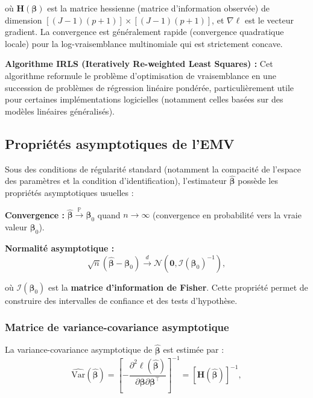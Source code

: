 \documentclass[12pt,a4paper]{article}
\begin{document}
où $\mathbf{H}(\boldsymbol{\beta})$ est la matrice hessienne (matrice d'information observée) de dimension $[(J-1)(p+1)] \times [(J-1)(p+1)]$, et $\nabla \ell$ est le vecteur gradient. La convergence est généralement rapide (convergence quadratique locale) pour la log-vraisemblance multinomiale qui est strictement concave.

\textbf{Algorithme IRLS (Iteratively Re-weighted Least Squares) :} Cet algorithme reformule le problème d'optimisation de vraisemblance en une succession de problèmes de régression linéaire pondérée, particulièrement utile pour certaines implémentations logicielles (notamment celles basées sur des modèles linéaires généralisés).

\subsection{Propriétés asymptotiques de l'EMV}

Sous des conditions de régularité standard (notamment la compacité de l'espace des paramètres et la condition d'identification), l'estimateur $\widehat{\boldsymbol{\beta}}$ possède les propriétés asymptotiques usuelles :

\textbf{Convergence :} $\widehat{\boldsymbol{\beta}} \xrightarrow{\mathbb{P}} \boldsymbol{\beta}_0$ quand $n \to \infty$ (convergence en probabilité vers la vraie valeur $\boldsymbol{\beta}_0$).

\textbf{Normalité asymptotique :} 
\begin{equation}\label{eq:asymptotic-normality}
\sqrt{n}(\widehat{\boldsymbol{\beta}} - \boldsymbol{\beta}_0) \xrightarrow{d} \mathcal{N}\left(\mathbf{0}, \mathcal{I}(\boldsymbol{\beta}_0)^{-1}\right),
\end{equation}

où $\mathcal{I}(\boldsymbol{\beta}_0)$ est la \textbf{matrice d'information de Fisher}. Cette propriété permet de construire des intervalles de confiance et des tests d'hypothèse.

\subsubsection{Matrice de variance-covariance asymptotique}

La variance-covariance asymptotique de $\widehat{\boldsymbol{\beta}}$ est estimée par :
\begin{equation}\label{eq:vcov}
\widehat{\text{Var}}(\widehat{\boldsymbol{\beta}}) = \left[ -\frac{\partial^2 \ell(\widehat{\boldsymbol{\beta}})}{\partial \boldsymbol{\beta} \partial \boldsymbol{\beta}^\top} \right]^{-1} = \left[ \mathbf{H}(\widehat{\boldsymbol{\beta}}) \right]^{-1},
\end{equation}
\end{document}

